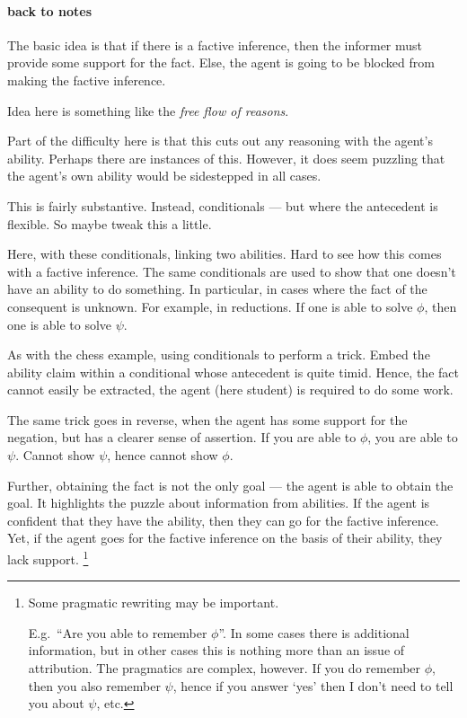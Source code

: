 \documentclass[10pt]{article}
\begin{document}
\paragraph{back to notes}

\begin{note}
  The basic idea is that if there is a factive inference, then the informer must provide some support for the fact.
  Else, the agent is going to be blocked from making the factive inference.

  Idea here is something like the \emph{free flow of reasons}.
\end{note}

Part of the difficulty here is that this cuts out any reasoning with the agent's ability.
Perhaps there are instances of this.
However, it does seem puzzling that the agent's own ability would be sidestepped in all cases.

This is fairly substantive.
Instead, conditionals --- but where the antecedent is flexible.
So maybe tweak this a little.

Here, with these conditionals, linking two abilities.
Hard to see how this comes with a factive inference.
The same conditionals are used to show that one doesn't have an ability to do something.
In particular, in cases where the fact of the consequent is unknown.
For example, in reductions.
If one is able to solve \(\phi\), then one is able to solve \(\psi\).

As with the chess example, using conditionals to perform a trick.
Embed the ability claim within a conditional whose antecedent is quite timid.
Hence, the fact cannot easily be extracted, the agent (here student) is required to do some work.

The same trick goes in reverse, when the agent has some support for the negation, but has a clearer sense of assertion.
If you are able to \(\phi\), you are able to \(\psi\).
Cannot show \(\psi\), hence cannot show \(\phi\).

Further, obtaining the fact is not the only goal --- the agent is able to obtain the goal.
It highlights the puzzle about information from abilities.
If the agent is confident that they have the ability, then they can go for the factive inference.
Yet, if the agent goes for the factive inference on the basis of their ability, they lack support.\nolinebreak
\footnote{
  Some pragmatic rewriting may be important.

  E.g.\ ``Are you able to remember \(\phi\)''.
  In some cases there is additional information, but in other cases this is nothing more than an issue of attribution.
  The pragmatics are complex, however.
  If you do remember \(\phi\), then you also remember \(\psi\), hence if you answer `yes' then I don't need to tell you about \(\psi\), etc.
}
\end{document}
